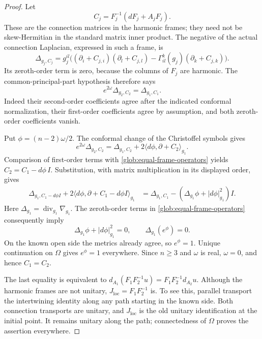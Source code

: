 \begin{proof}
Let
\[
 C_j=F_j^{-1}(dF_j+A_jF_j).
\]
These are the connection matrices in the harmonic frames; they
need not be skew-Hermitian in the standard matrix inner product.
The negative of the actual connection Laplacian, expressed in
such a frame, is
\[
 \Delta_{g_j,C_j}
 =g_j^{il}\bigl((\partial_i+C_{j,i})(\partial_l+C_{j,l})
       -\Gamma^k_{il}(g_j)(\partial_k+C_{j,k})\bigr).
\]
Its zeroth-order term is zero, because the columns of \(F_j\)
are harmonic.  The common-principal-part hypothesis therefore
says
\begin{equation}\label{glob:equal-frame-operators}
             e^{2\omega}\Delta_{g_2,C_2}=\Delta_{g_1,C_1}.
\end{equation}
Indeed their second-order coefficients agree after the indicated
conformal normalization, their first-order coefficients agree
by assumption, and both zeroth-order coefficients vanish.

Put \(\phi=(n-2)\omega/2\).  The conformal change of the
Christoffel symbols gives
\[
 e^{2\omega}\Delta_{g_2,C_2}
 =\Delta_{g_1,C_2}
          +2\langle d\phi,\partial+C_2\rangle_{g_1}.
\]
Comparison of first-order terms with
\eqref{glob:equal-frame-operators} yields
\(C_2=C_1-d\phi\,I\).  Substitution, with matrix multiplication
in its displayed order, gives
\begin{align*}
 \Delta_{g_1,C_1-d\phi I}
       +2\langle d\phi,\partial+C_1-d\phi I\rangle_{g_1}
 &=\Delta_{g_1,C_1}
       -(\Delta_{g_1}\phi+|d\phi|_{g_1}^2)I.
\end{align*}
Here \(\Delta_{g_1}=\operatorname{div}_{g_1}\nabla_{g_1}\).
The zeroth-order terms in
\eqref{glob:equal-frame-operators} consequently imply
\[
 \Delta_{g_1}\phi+|d\phi|_{g_1}^2=0,
 \qquad \Delta_{g_1}(e^\phi)=0.
\]
On the known open side the metrics already agree, so
\(e^\phi=1\).  Unique continuation on \(\Omega\) gives
\(e^\phi=1\) everywhere.  Since \(n\ge3\) and \(\omega\) is
real, \(\omega=0\), and hence \(C_1=C_2\).

The last equality is equivalent to
\(d_{A_1}(F_1F_2^{-1}u)=F_1F_2^{-1}d_{A_2}u\).
Although the harmonic frames are not unitary,
\(J_{\mathrm{loc}}=F_1F_2^{-1}\) is.  To see this, parallel
transport the intertwining identity along any path starting in
the known side.  Both connection transports are unitary, and
\(J_{\mathrm{loc}}\) is the old unitary identification at the
initial point.  It remains unitary along the path; connectedness
of \(\Omega\) proves the assertion everywhere.


\end{proof}
